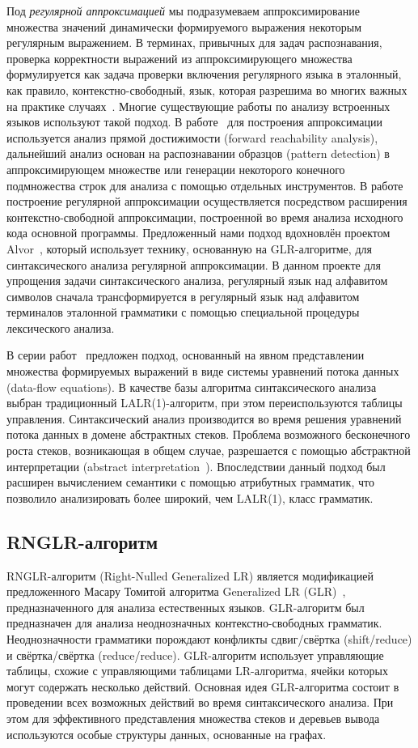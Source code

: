 Под \emph{регулярной аппроксимацией} мы подразумеваем аппроксимирование множества значений динамически формируемого выражения некоторым регулярным выражением. В терминах, привычных для задач распознавания, проверка корректности выражений из аппроксимирующего множества формулируется как задача проверки включения регулярного языка в эталонный, как правило, контекстно-свободный, язык, которая разрешима во многих важных на практике случаях~\cite{LangInclusion}. Многие существующие работы по анализу встроенных языков используют такой подход. В работе~\cite{Stranger} для построения аппроксимации используется анализ прямой достижимости (forward reachability analysis), дальнейший анализ основан на распознавании образцов (pattern detection) в аппроксимирующем множестве или генерации некоторого конечного подмножества строк для анализа с помощью отдельных инструментов. В работе~\cite{JSA} построение регулярной аппроксимации осуществляется посредством расширения контекстно-свободной аппроксимации, построенной во время анализа исходного кода основной программы. Предложенный нами подход вдохновлён проектом Alvor~\cite{Alvor,Alvor2}, который использует технику, основанную на GLR-алгоритме, для синтаксического анализа регулярной аппроксимации. В данном проекте для упрощения задачи синтаксического анализа, регулярный язык над алфавитом символов сначала трансформируется в регулярный язык над алфавитом терминалов эталонной грамматики с помощью специальной процедуры лексического анализа. 

В серии работ~\cite{AbstrParsing,LRAbstrParsing,LRAbstrParsingSema} предложен подход, основанный на явном представлении множества формируемых выражений в виде системы уравнений потока данных (data-flow equations). В качестве базы алгоритма синтаксического анализа выбран традиционный LALR(1)-алгоритм, при этом переиспользуются таблицы управления. Синтаксический анализ производится во время решения уравнений потока данных в домене абстрактных стеков. Проблема возможного бесконечного роста стеков, возникающая в общем случае, разрешается с помощью абстрактной интерпретации (abstract interpretation~\cite{AbstractInterpretation}). Впоследствии данный подход был расширен вычислением семантики с помощью атрибутных грамматик, что позволило анализировать более широкий, чем LALR(1), класс грамматик. 

\subsection{RNGLR-алгоритм}
RNGLR-алгоритм (Right-Nulled Generalized LR) является модификацией предложенного Масару Томитой алгоритма Generalized LR (GLR)~\cite{Tomita}, предназначенного для анализа естественных языков. GLR-алгоритм был предназначен для анализа неоднозначных контекстно-свободных грамматик. Неоднозначности грамматики порождают конфликты сдвиг/свёртка (shift/reduce) и свёртка/свёртка (reduce/reduce). GLR-алгоритм использует управляющие таблицы, схожие с управляющими таблицами LR-алгоритма, ячейки которых могут содержать несколько действий. Основная идея GLR-алгоритма состоит в проведении всех возможных действий во время синтаксического анализа. При этом для эффективного представления множества стеков и деревьев вывода используются особые структуры данных, основанные на графах.

